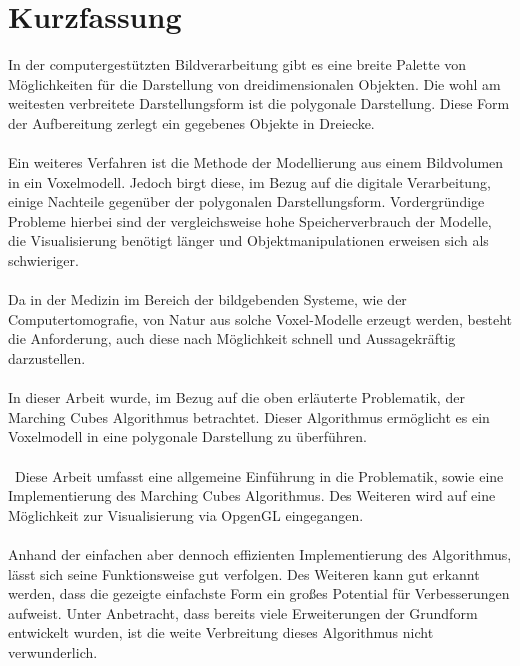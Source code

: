 
\chapter{Kurzfassung}

In der computergestützten Bildverarbeitung gibt es eine breite Palette von Möglichkeiten für die Darstellung von dreidimensionalen Objekten. Die wohl am weitesten verbreitete Darstellungsform ist die polygonale Darstellung. Diese Form der Aufbereitung zerlegt ein gegebenes Objekte in Dreiecke. 
\\\\
Ein weiteres Verfahren ist die Methode der Modellierung aus einem Bildvolumen in ein Voxelmodell. Jedoch birgt diese, im Bezug auf die digitale Verarbeitung, einige Nachteile gegenüber der polygonalen Darstellungsform. Vordergründige Probleme hierbei sind der vergleichsweise hohe Speicherverbrauch der Modelle, die Visualisierung benötigt länger und Objektmanipulationen erweisen sich als schwieriger.
\\\\
Da in der Medizin im Bereich der bildgebenden Systeme, wie der Computertomografie, von Natur aus solche Voxel-Modelle erzeugt werden, besteht die Anforderung, auch diese nach Möglichkeit schnell und Aussagekräftig darzustellen.
\\\\
In dieser Arbeit wurde, im Bezug auf die oben erläuterte Problematik, der Marching Cubes Algorithmus betrachtet. Dieser Algorithmus ermöglicht es ein Voxelmodell in eine polygonale Darstellung zu überführen. 
\\\\\
Diese Arbeit umfasst eine allgemeine Einführung in die Problematik, sowie eine Implementierung des Marching Cubes Algorithmus. Des Weiteren wird auf eine Möglichkeit zur Visualisierung via OpgenGL eingegangen.
\\\\
Anhand der einfachen aber dennoch effizienten Implementierung des Algorithmus, lässt sich seine Funktionsweise gut verfolgen. Des Weiteren kann gut erkannt werden, dass die gezeigte einfachste Form ein großes Potential für Verbesserungen aufweist. Unter Anbetracht, dass bereits viele Erweiterungen der Grundform entwickelt wurden, ist die weite Verbreitung dieses Algorithmus nicht verwunderlich.
